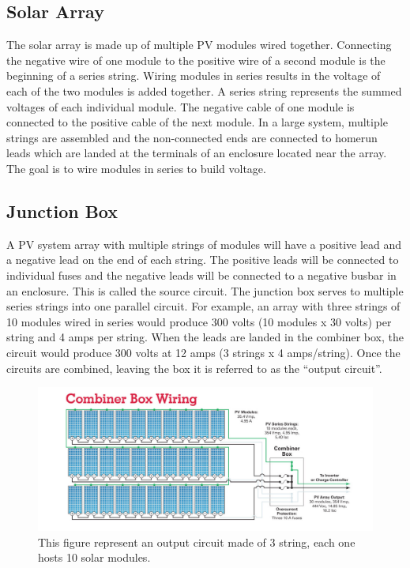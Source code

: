 \subsection{Solar Array}
The solar array is made up of multiple PV modules wired
together. Connecting the negative wire of one module to
the positive wire of a second module is the beginning of a
series string. Wiring modules in series results in the voltage of
each of the two modules is added together. A series string represents the summed voltages of each
individual module. The negative cable of one module is connected
to the positive cable of the next module. In a large system,
multiple strings are assembled and the non-connected ends are
connected to homerun leads which are landed at the terminals
of an enclosure located near the array.
The goal is to wire modules in series to build voltage.

\subsection{Junction Box}
A PV system array with multiple strings of modules will
have a positive lead and a negative lead on the end of each
string. The positive leads will be connected to individual
fuses and the negative leads will be connected to a negative
busbar in an enclosure. This is called the source circuit\cite{pvarizona}. The
junction box serves to  multiple series strings into
one parallel circuit. For example, an array with three strings
of 10 modules wired in series would produce 300 volts (10
modules x 30 volts) per string and 4 amps per string. When
the leads are landed in the combiner box, the circuit would
produce 300 volts at 12 amps (3 strings x 4 amps/string). Once
the circuits are combined, leaving the box it is referred to as
the “output circuit”.

\begin{figure}[H]
	\centering
	\includegraphics[width=\textwidth, keepaspectratio]{chapters/1_introduction/imgs/junctionbox.png}
	\caption{This figure represent an output circuit made of 3 string, each one hosts 10 solar modules\cite{pvarizona}.}
	\label{fig:outcircuit}
\end{figure}


